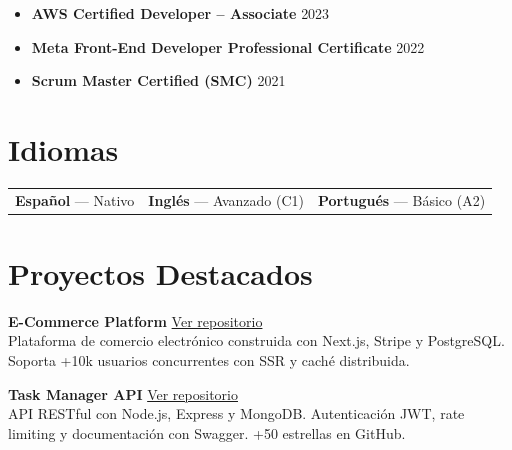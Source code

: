 \documentclass[11pt,a4paper]{article}
\begin{document}
\begin{itemize}[leftmargin=14pt, itemsep=3pt, topsep=0pt]
  \item \textbf{AWS Certified Developer -- Associate} \hfill {\small\color{graytext}2023}
  \item \textbf{Meta Front-End Developer Professional Certificate} \hfill {\small\color{graytext}2022}
  \item \textbf{Scrum Master Certified (SMC)} \hfill {\small\color{graytext}2021}
\end{itemize}

\section{\faLanguage\hspace{6pt}Idiomas}

\begin{tabularx}{\textwidth}{X X X}
  \textbf{Español} --- Nativo &
  \textbf{Inglés} --- Avanzado (C1) &
  \textbf{Portugués} --- Básico (A2)
\end{tabularx}

\section{\faRocket\hspace{6pt}Proyectos Destacados}

\textbf{\color{darktext}E-Commerce Platform} \hfill
\href{https://github.com/tuusuario/ecommerce}{\faGithub\hspace{2pt}\small\color{accent}Ver repositorio}\\
{\small Plataforma de comercio electrónico construida con Next.js, Stripe y PostgreSQL.
Soporta +10k usuarios concurrentes con SSR y caché distribuida.}
\vspace{8pt}

\textbf{\color{darktext}Task Manager API} \hfill
\href{https://github.com/tuusuario/task-api}{\faGithub\hspace{2pt}\small\color{accent}Ver repositorio}\\
{\small API RESTful con Node.js, Express y MongoDB. Autenticación JWT,
rate limiting y documentación con Swagger. +50 estrellas en GitHub.}
\end{document}
